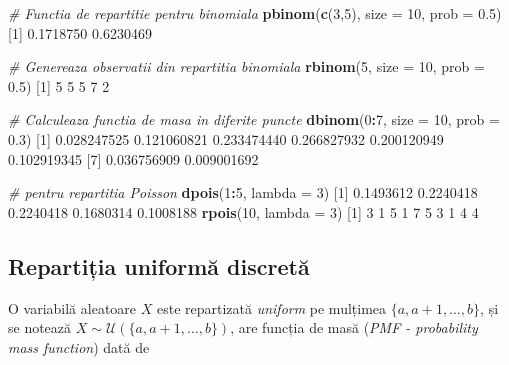 \documentclass[]{article}
\newenvironment{Shaded}{\begin{snugshade}}{\end{snugshade}}
\newcommand{\KeywordTok}[1]{\textcolor[rgb]{0.13,0.29,0.53}{\textbf{#1}}}
\newcommand{\DataTypeTok}[1]{\textcolor[rgb]{0.13,0.29,0.53}{#1}}
\newcommand{\DecValTok}[1]{\textcolor[rgb]{0.00,0.00,0.81}{#1}}
\newcommand{\FloatTok}[1]{\textcolor[rgb]{0.00,0.00,0.81}{#1}}
\newcommand{\CommentTok}[1]{\textcolor[rgb]{0.56,0.35,0.01}{\textit{#1}}}
\newcommand{\OperatorTok}[1]{\textcolor[rgb]{0.81,0.36,0.00}{\textbf{#1}}}
\newcommand{\NormalTok}[1]{#1}
\begin{document}
\begin{Shaded}
\begin{Highlighting}[]
\CommentTok{# Functia de repartitie pentru binomiala}
\KeywordTok{pbinom}\NormalTok{(}\KeywordTok{c}\NormalTok{(}\DecValTok{3}\NormalTok{,}\DecValTok{5}\NormalTok{), }\DataTypeTok{size =} \DecValTok{10}\NormalTok{, }\DataTypeTok{prob =} \FloatTok{0.5}\NormalTok{)}
\NormalTok{[}\DecValTok{1}\NormalTok{] }\FloatTok{0.1718750} \FloatTok{0.6230469}

\CommentTok{# Genereaza observatii din repartitia binomiala}
\KeywordTok{rbinom}\NormalTok{(}\DecValTok{5}\NormalTok{, }\DataTypeTok{size =} \DecValTok{10}\NormalTok{, }\DataTypeTok{prob =} \FloatTok{0.5}\NormalTok{)}
\NormalTok{[}\DecValTok{1}\NormalTok{] }\DecValTok{5} \DecValTok{5} \DecValTok{5} \DecValTok{7} \DecValTok{2}

\CommentTok{# Calculeaza functia de masa in diferite puncte}
\KeywordTok{dbinom}\NormalTok{(}\DecValTok{0}\OperatorTok{:}\DecValTok{7}\NormalTok{, }\DataTypeTok{size =} \DecValTok{10}\NormalTok{, }\DataTypeTok{prob =} \FloatTok{0.3}\NormalTok{)}
\NormalTok{[}\DecValTok{1}\NormalTok{] }\FloatTok{0.028247525} \FloatTok{0.121060821} \FloatTok{0.233474440} \FloatTok{0.266827932} \FloatTok{0.200120949} \FloatTok{0.102919345}
\NormalTok{[}\DecValTok{7}\NormalTok{] }\FloatTok{0.036756909} \FloatTok{0.009001692}

\CommentTok{# pentru repartitia Poisson}
\KeywordTok{dpois}\NormalTok{(}\DecValTok{1}\OperatorTok{:}\DecValTok{5}\NormalTok{, }\DataTypeTok{lambda =} \DecValTok{3}\NormalTok{)}
\NormalTok{[}\DecValTok{1}\NormalTok{] }\FloatTok{0.1493612} \FloatTok{0.2240418} \FloatTok{0.2240418} \FloatTok{0.1680314} \FloatTok{0.1008188}
\KeywordTok{rpois}\NormalTok{(}\DecValTok{10}\NormalTok{, }\DataTypeTok{lambda =} \DecValTok{3}\NormalTok{)}
\NormalTok{ [}\DecValTok{1}\NormalTok{] }\DecValTok{3} \DecValTok{1} \DecValTok{5} \DecValTok{1} \DecValTok{7} \DecValTok{5} \DecValTok{3} \DecValTok{1} \DecValTok{4} \DecValTok{4}
\end{Highlighting}
\end{Shaded}

\subsection{Repartiția uniformă
discretă}\label{repartitia-uniforma-discreta}

O variabilă aleatoare \(X\) este repartizată \emph{uniform} pe mulțimea
\(\{a, a+1, \ldots, b\}\), și se notează
\(X\sim\mathcal{U}(\{a, a+1, \ldots, b\})\), are funcția de masă
(\emph{PMF - probability mass function}) dată de
\end{document}
